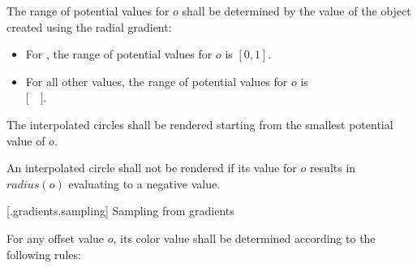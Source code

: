 \pnum
The range of potential values for $o$ shall be determined by the  value of the  object created using the radial gradient:
\begin{itemize}
\item For , the range of potential values for $o$ is $[0,1]$.
\item For all other  values, the range of potential values for $o$ is\\ $[$~~$]$.
\end{itemize}

\pnum
The interpolated circles shall be rendered starting from the smallest potential value of $o$.

\pnum
An interpolated circle shall not be rendered if its value for $o$ results in $radius(o)$ evaluating to a negative value.

 [\iotwod.gradients.sampling] {Sampling from gradients}

\pnum
For any offset value $o$, its color value shall be determined according to the following rules:

